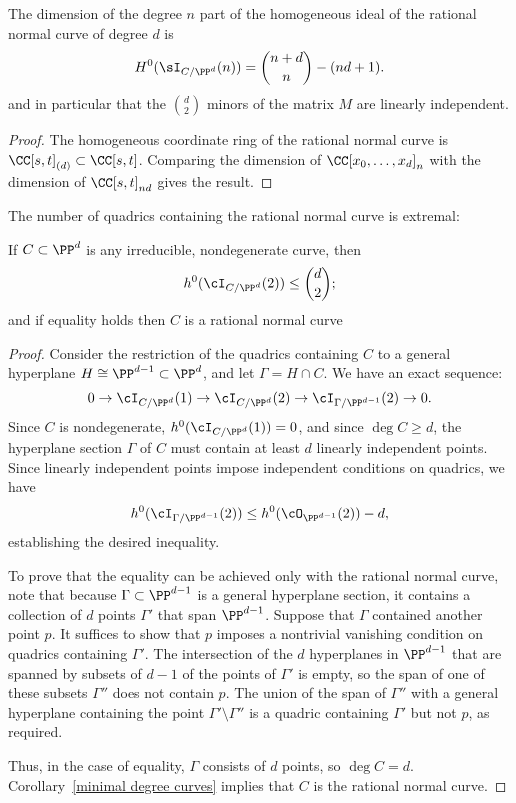 \begin{corollary}\label{forms vanishing on the RNC}
The dimension of the degree $n$ part of the homogeneous ideal of the rational normal curve of degree $d$ is
$$
H^0(\sI_{C/\PP^d}(n)) = \binom{n+d}{n} - (nd+1).
$$
and in particular that the $\binom{d}{ 2}$ minors of the matrix $M$ are linearly independent.
\end{corollary}

\begin{proof}
The homogeneous coordinate ring of the rational normal curve is $\CC[s,t]_{(d)}\subset \CC[s,t]$. Comparing the dimension
of $\CC[x_0,\dots,x_d]_n$ with the dimension of $\CC[s,t]_{nd}$ gives the result.
\end{proof}

The number of quadrics containing the rational normal curve is extremal:

\begin{proposition}\label{rnc on most quadrics}
If $C \subset \PP^d$ is any irreducible, nondegenerate curve, then
$$
h^0(\cI_{C/\PP^d}(2)) \leq  \binom{d}{2};
$$
and if equality holds then $C$ is a rational normal curve
\end{proposition}

\begin{proof}
Consider the restriction of the quadrics containing $C$ to a general hyperplane $H \cong \PP^{d-1} \subset \PP^d$, and let $\Gamma = H \cap C$. We have an exact sequence:
$$
0 \to \cI_{C/\PP^d}(1) \to \cI_{C/\PP^d}(2) \to \cI_{\Gamma/\PP^{d-1}}(2) \to 0.
$$ 
Since $C$ is nondegenerate, $h^0(\cI_{C/\PP^d}(1)) = 0$, and since $\deg C \geq d$, the hyperplane section $\Gamma$ of $C$ must contain at least $d$ linearly independent points. Since linearly independent points impose independent conditions on quadrics, we have
$$
h^0(\cI_{\Gamma/\PP^{d-1}}(2)) \leq h^0(\cO_{\PP^{d-1}}(2)) - d,
$$
establishing the desired inequality. 

To prove that the equality can be achieved only with the rational normal curve, note that because  $\Gamma\subset \PP^{d-1}$
is a general hyperplane section, it
contains a collection of $d$  points $\Gamma'$ that span $\PP^{d-1}$. Suppose that $\Gamma$ contained another point $p$.
It suffices to show that $p$ imposes a nontrivial vanishing condition on quadrics containing $\Gamma'$.
The intersection of the $d$ hyperplanes in $\PP^{d-1}$ that are spanned by subsets of $d-1$ of the
points of $\Gamma'$ is empty, so the span of one of these subsets $\Gamma''$ does not contain $p$. The union of 
the span of $\Gamma''$ with a general hyperplane containing the point $\Gamma' \setminus \Gamma''$
is a quadric containing $\Gamma'$ but not $p$, as required. 

Thus, in the case of equality, $\Gamma$ consists of $d$ points, so $\deg C = d$.
Corollary~\ref{minimal degree curves} implies that $C$ is the rational normal curve.
\end{proof}

